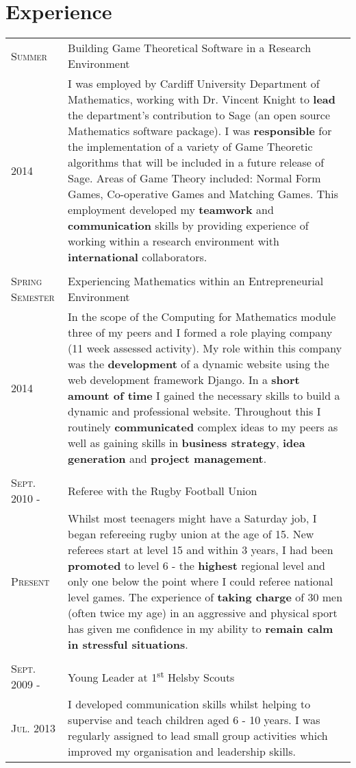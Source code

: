 \documentclass[a4paper]{article}
\begin{document}
\section{Experience}
\begin{tabularx}{\textwidth}{lX}

\textsc{Summer} & Building Game Theoretical Software in a Research Environment \\
\textsc{2014}& \footnotesize{I was employed by Cardiff University Department of Mathematics, working with Dr. Vincent Knight to \textbf{lead} the department's contribution to Sage (an open source Mathematics software package).
I was \textbf{responsible} for the implementation of a variety of Game Theoretic algorithms that will be included in a future release of Sage.
Areas of Game Theory included: Normal Form Games, Co-operative Games and Matching Games.
This employment developed my \textbf{teamwork} and \textbf{communication} skills by providing experience of working within a research environment with \textbf{international} collaborators.}\\
\\

\textsc{Spring Semester} & Experiencing Mathematics within an Entrepreneurial Environment\\
\textsc{2014}& \footnotesize{In the scope of the Computing for Mathematics module three of my peers and I formed a role playing company (11 week assessed activity).
My role within this company was the \textbf{development} of a dynamic website using the web development framework Django.
In a \textbf{short amount of time} I gained the necessary skills to build a dynamic and professional website.
Throughout this I routinely \textbf{communicated} complex ideas to my peers as well as gaining skills in \textbf{business strategy}, \textbf{idea generation} and \textbf{project management}.
}\\
\\
\textsc{Sept. 2010 -} & Referee with the Rugby Football Union \\
\textsc{Present} & \footnotesize{Whilst most teenagers might have a Saturday job, I began refereeing rugby union at the age of 15.
New referees start at level 15 and within 3 years, I had been \textbf{promoted} to level 6 - the \textbf{highest} regional level and only one below the point where I could referee national level games.
The experience of \textbf{taking charge} of 30 men (often twice my age) in an aggressive and physical sport has given me confidence in my ability to \textbf{remain calm in stressful situations}.}\\
\\
\textsc{Sept. 2009 -} & Young Leader at 1\textsuperscript{st} Helsby Scouts\\
\textsc{Jul. 2013}& \footnotesize{I developed communication skills whilst helping to supervise and teach children aged 6 - 10 years.
I was regularly assigned to lead small group activities which improved my organisation and leadership skills.}\\

\end{tabularx}
\end{document}
